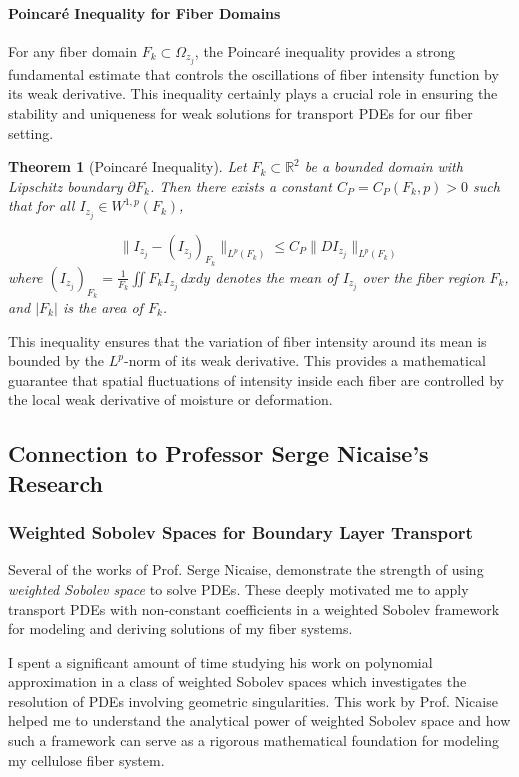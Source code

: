 \documentclass[11pt]{article}
\newtheorem{theorem}{Theorem}[section]
\begin{document}
\paragraph{Poincar\'e Inequality for Fiber Domains}

For any fiber domain $F_k \subset \Omega_{z_j}$, the Poincar\'e inequality provides a strong fundamental estimate that controls the oscillations of fiber intensity function by its weak derivative. This inequality certainly plays a crucial role in ensuring the stability and uniqueness for weak solutions for transport PDEs for our fiber setting. 

\begin{theorem}[Poincar\'e Inequality]
Let $F_k \subset \mathbb{R}^2$ be a bounded domain with Lipschitz boundary $\partial F_k$. Then there exists a constant $C_P = C_P(F_k, p) > 0$ such that for all $I_{z_j} \in W^{1, p}(F_k)$,

\[
\|I_{z_j} - (I_{z_j})_{F_k}\|_{L^p(F_k)} \leq C_P \|DI_{z_j}\|_{L^p(F_k)}
\]
where $(I_{z_j})_{F_k} = \frac{1}{F_k}\iint F_k I_{z_j} \, dxdy$ denotes the mean of $I_{z_j}$ over the fiber region $F_k$, and $|F_k|$ is the area of $F_k$. 
\end{theorem}

This inequality ensures that the variation of fiber intensity around its mean is bounded by the $L^p$-norm of its weak derivative. This provides a mathematical guarantee that spatial fluctuations of intensity inside each fiber are controlled by the local weak derivative of moisture or deformation. 

\subsection{Connection to Professor Serge Nicaise's Research}

\subsubsection{Weighted Sobolev Spaces for Boundary Layer Transport}

Several of the works of Prof. Serge Nicaise, demonstrate the strength of using \textit{weighted Sobolev space} to solve PDEs. These deeply motivated me to apply transport PDEs with non-constant coefficients in a weighted Sobolev framework for modeling and deriving solutions of my fiber systems.

I spent a significant amount of time studying his work on polynomial approximation in a class of weighted Sobolev spaces \cite{nicaise2000jacobi} which investigates the resolution of PDEs involving geometric singularities. This work by Prof. Nicaise helped me to understand the analytical power of weighted Sobolev space and how such a framework can serve as a rigorous  mathematical foundation for modeling my cellulose fiber system.
\end{document}
